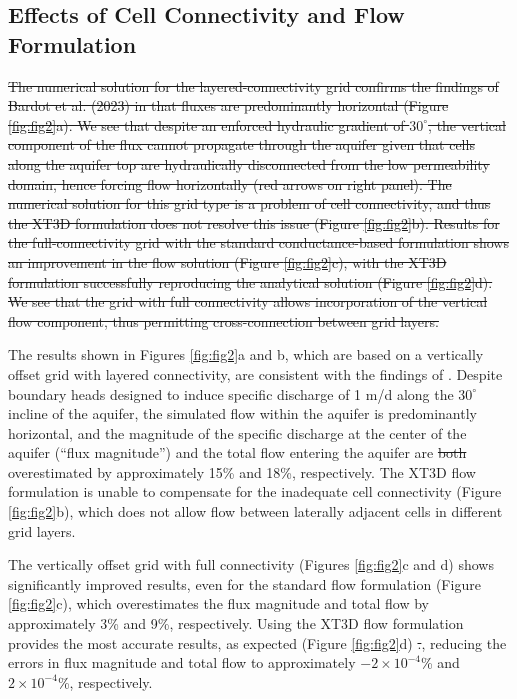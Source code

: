 \documentclass{article}
\begin{document}
\subsection*{Effects of Cell Connectivity and Flow Formulation}

{\color{red} \sout{The numerical solution for the layered-connectivity grid confirms the findings of Bardot et al. (2023) in that fluxes are predominantly horizontal (Figure \ref{fig:fig2}a). We see that despite an enforced hydraulic gradient of $30^{\circ}$, the vertical component of the flux cannot propagate through the aquifer given that cells along the aquifer top are hydraulically disconnected from the low permeability domain, hence forcing flow horizontally (red arrows on right panel). The numerical solution for this grid type is a problem of cell connectivity, and thus the XT3D formulation does not resolve this issue (Figure \ref{fig:fig2}b). Results for the full-connectivity grid with the standard conductance-based formulation shows an improvement in the flow solution (Figure \ref{fig:fig2}c), with the XT3D formulation successfully reproducing the analytical solution (Figure \ref{fig:fig2}d). We see that the grid with full connectivity allows incorporation of the vertical flow component, thus permitting cross-connection between grid layers.}}

The results shown in Figures \ref{fig:fig2}a and b, which are based on a vertically offset grid with layered connectivity, are consistent with the findings of \cite{bardot2023}. Despite boundary heads designed to induce specific discharge of 1 m/d along the $30^{\circ}$ incline of the aquifer, the simulated flow within the aquifer is predominantly horizontal, and the magnitude of the specific discharge at the center of the aquifer {\color{red} (``flux magnitude'')} and the total flow entering the aquifer are {\color{red} \sout{both}} overestimated {\color{red}by approximately 15\% and 18\%, respectively}. The XT3D flow formulation is unable to compensate for the inadequate cell connectivity (Figure \ref{fig:fig2}b), which does not allow flow between laterally adjacent cells in different grid layers.

The vertically offset grid with full connectivity (Figures \ref{fig:fig2}c and d) shows significantly improved results, even for the standard flow formulation (Figure \ref{fig:fig2}c){\color{red}, which overestimates the flux magnitude and total flow by approximately 3\% and 9\%, respectively.} Using the XT3D flow formulation provides the most accurate results, as expected (Figure \ref{fig:fig2}d){\color{red} \sout{.}, reducing the errors in flux magnitude and total flow to approximately $-2 \times 10^{-4}$\% and $2 \times 10^{-4}$\%, respectively.}
\end{document}
